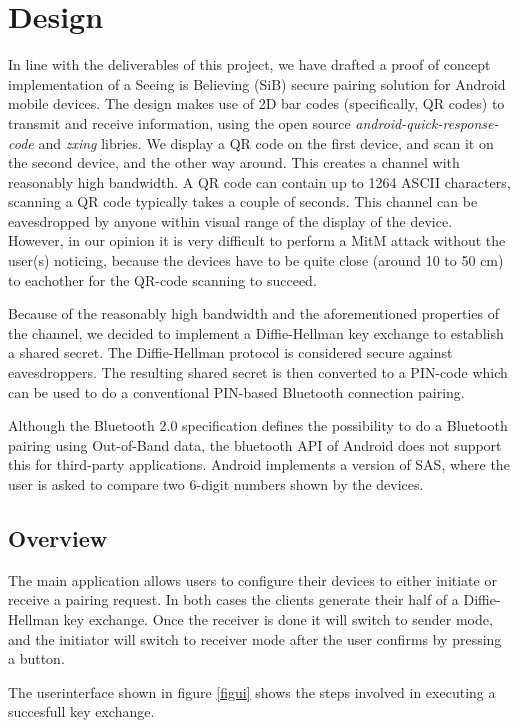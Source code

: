\documentclass[conference, 11pt]{sty/IEEEtran}
\begin{document}
\section{Design}
\label{sec:design}
In line with the deliverables of this project, we have drafted a proof of concept implementation of a Seeing is Believing (SiB) secure pairing solution for Android mobile devices.
The design makes use of 2D bar codes (specifically, QR codes) to transmit and receive information, using the open source \textit{android-quick-response-code}\cite{aqrc} and \textit{zxing}\cite{zxing} libries.
We display a QR code on the first device, and scan it on the second device, and the other way around.
This creates a channel with reasonably high bandwidth.
A QR code can contain up to 1264 ASCII characters, scanning a QR code typically takes a couple of seconds. 
This channel can be eavesdropped by anyone within visual range of the display of the device.
However, in our opinion it is very difficult to perform a MitM attack without the user(s) noticing, because the devices have to be quite close (around 10 to 50 cm) to eachother for the QR-code scanning to succeed.

Because of the reasonably high bandwidth and the aforementioned properties of the channel, we decided to implement a Diffie-Hellman key exchange to establish a shared secret. The Diffie-Hellman protocol is considered secure against eavesdroppers.
The resulting shared secret is then converted to a PIN-code which can be used to do a conventional PIN-based Bluetooth connection pairing.

Although the Bluetooth 2.0 specification defines the possibility to do a Bluetooth pairing using Out-of-Band data, the bluetooth API of Android does not support this for third-party applications. Android implements a version of SAS, where the user is asked to compare two 6-digit numbers shown by the devices.

\subsection{Overview}
\label{ssec:overview}
The main application allows users to configure their devices to either initiate or receive a pairing request.
In both cases the clients generate their half of a Diffie-Hellman key exchange.
Once the receiver is done it will switch to sender mode, and the initiator will switch to receiver mode after the user confirms by pressing a button.

The userinterface shown in figure \ref{figui} shows the steps involved in executing a succesfull key exchange.
\end{document}
